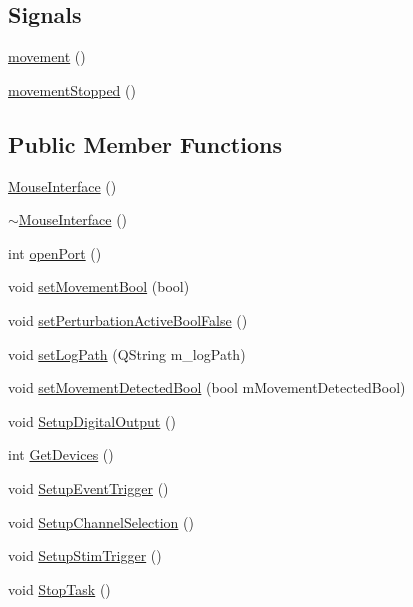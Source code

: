 \subsection*{Signals}
\begin{DoxyCompactItemize}
\item 
\hyperlink{class_mouse_interface_a05ade9c71b34d400bd7e82a7119edf38}{movement} ()
\item 
\hyperlink{class_mouse_interface_a685376f397497ea5c91998e7cec4463e}{movement\+Stopped} ()
\end{DoxyCompactItemize}
\subsection*{Public Member Functions}
\begin{DoxyCompactItemize}
\item 
\hyperlink{class_mouse_interface_a36669205adb92c00543ba26d73661c01}{Mouse\+Interface} ()
\item 
\hyperlink{class_mouse_interface_a74e418ec1c00dda177cbcdbd3bcf8258}{$\sim$\+Mouse\+Interface} ()
\item 
int \hyperlink{class_mouse_interface_afffa2b2ea4250fc392451c51497cf99a}{open\+Port} ()
\item 
void \hyperlink{class_mouse_interface_a8e6054b825c48d9bcdb539fc1625e5d5}{set\+Movement\+Bool} (bool)
\item 
void \hyperlink{class_mouse_interface_a6c0c368eecb5642747fab25d426fb774}{set\+Perturbation\+Active\+Bool\+False} ()
\item 
void \hyperlink{class_mouse_interface_ae0058db1b8c881a51c446518cdf992d7}{set\+Log\+Path} (Q\+String m\+\_\+log\+Path)
\item 
void \hyperlink{class_mouse_interface_a51ed7e2eaaacd6f471c93c2537fa228c}{set\+Movement\+Detected\+Bool} (bool m\+Movement\+Detected\+Bool)
\item 
void \hyperlink{class_mouse_interface_a2f92521a090ccb91f672f87d80493ec0}{Setup\+Digital\+Output} ()
\item 
int \hyperlink{class_mouse_interface_ae6345485870f61952b488823e6b56d76}{Get\+Devices} ()
\item 
void \hyperlink{class_mouse_interface_a6f60ced71ed9ac307b019cb300e44a32}{Setup\+Event\+Trigger} ()
\item 
void \hyperlink{class_mouse_interface_a698ae8e0768d1c1cbfc80c0c53ba9dd3}{Setup\+Channel\+Selection} ()
\item 
void \hyperlink{class_mouse_interface_a913cdae50fddc45ee67131d762735dbc}{Setup\+Stim\+Trigger} ()
\item 
void \hyperlink{class_mouse_interface_a818fc677dc9766a611bb847fdbd9589e}{Stop\+Task} ()
\end{DoxyCompactItemize}
